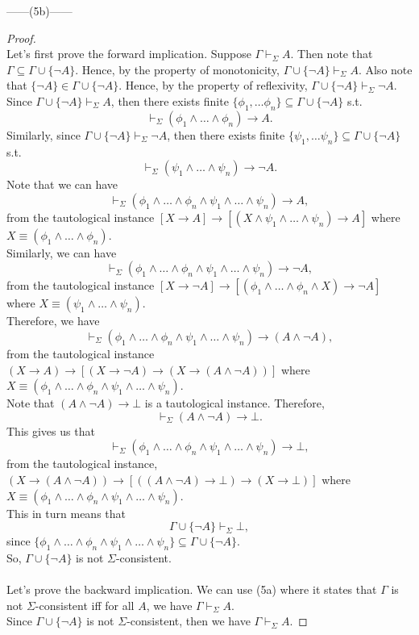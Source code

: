 \documentclass[12pt]{article}
\newcommand{\dr}{\vdash_{\Sigma}}
\begin{document}
\noindent
\begin{center}
    ------(5b)------
\end{center} 
\begin{proof} $ $\\
    Let's first prove the forward implication.
    Suppose $\Gamma \dr A$. 
    Then note that $\Gamma \subseteq \Gamma \cup \{\neg A\}$.
    Hence, by the property of monotonicity, $\Gamma \cup \{\neg A\} \dr A$.
    Also note that $\{\neg A\} \in \Gamma \cup \{\neg A\}$.
    Hence, by the property of reflexivity, $\Gamma \cup \{\neg A\} \dr \neg A$.\\
    Since $\Gamma \cup \{\neg A\} \dr A$, then there exists finite $\{\phi_1, \dots \phi_n \} \subseteq \Gamma \cup \{\neg A\}$ s.t.
    $$\dr (\phi_1 \land \dots \land \phi_n) \to A.$$
    Similarly, since $\Gamma \cup \{\neg A\} \dr \neg A$, then there exists finite $\{\psi_1, \dots \psi_n \} \subseteq \Gamma \cup \{\neg A\}$ s.t.
    $$\dr (\psi_1 \land \dots \land \psi_n) \to \neg A.$$
    Note that we can have
    $$\dr (\phi_1 \land \dots \land \phi_n \land \psi_1 \land \dots \land \psi_n) \to A,$$
    from the tautological instance
    $[X \to A] \to [(X \land \psi_1 \land \dots \land \psi_n) \to A]$ where $X \equiv (\phi_1 \land \dots \land \phi_n)$.\\
    Similarly, we can have
    $$\dr (\phi_1 \land \dots \land \phi_n \land \psi_1 \land \dots \land \psi_n) \to \neg A,$$
    from the tautological instance
    $[X \to \neg A] \to [(\phi_1 \land \dots \land \phi_n \land X) \to \neg A]$ where $X \equiv (\psi_1 \land \dots \land \psi_n)$.\\
    Therefore, we have
    $$\dr (\phi_1 \land \dots \land \phi_n \land \psi_1 \land \dots \land \psi_n) \to (A \land \neg A),$$
    from the tautological instance
    $(X \to A) \to [(X \to \neg A) \to (X \to (A \land \neg A))]$ where $X \equiv (\phi_1 \land \dots \land \phi_n \land \psi_1 \land \dots \land \psi_n)$.\\
    Note that $(A \land \neg A) \to \bot$ is a tautological instance. Therefore,
    $$\dr (A \land \neg A) \to \bot.$$
    This gives us that
    $$\dr (\phi_1 \land \dots \land \phi_n \land \psi_1 \land \dots \land \psi_n) \to \bot,$$
    from the tautological instance,
    $(X \to (A \land \neg A)) \to [((A \land \neg A) \to \bot) \to (X \to \bot)]$ where $X \equiv (\phi_1 \land \dots \land \phi_n \land \psi_1 \land \dots \land \psi_n)$.\\
    This in turn means that $$\Gamma \cup \{\neg A\} \dr \bot,$$
    since $\{\phi_1 \land \dots \land \phi_n \land \psi_1 \land \dots \land \psi_n\} \subseteq \Gamma \cup \{\neg A\}$.\\
    So, $\Gamma \cup \{\neg A\}$ is not $\Sigma$-consistent.\\
    \\
    Let's prove the backward implication.
    We can use (5a) where it states that $\Gamma$ is not $\Sigma$-consistent iff for all $A$, we have $\Gamma \dr A$.\\
    Since $\Gamma \cup \{\neg A\}$ is not $\Sigma$-consistent, then we have $\Gamma \dr A$.

\end{proof}
\end{document}
